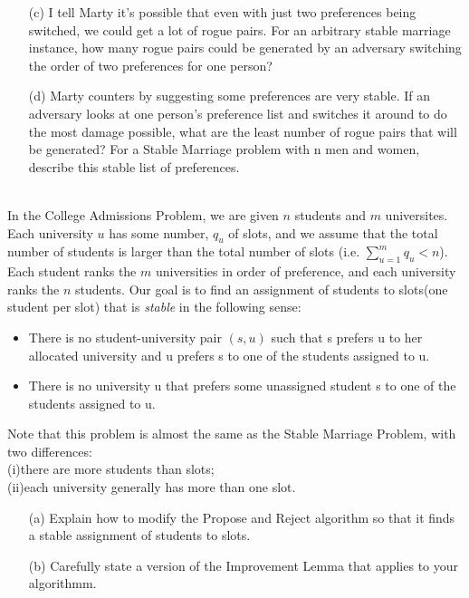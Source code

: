 \documentclass[11pt]{article}
\begin{document}
\begin{qunlist}
\begin{itemize}
\item[(c)] I tell Marty it's possible that even with just two preferences being switched, we could get a lot of rogue pairs. For an arbitrary stable marriage instance, how many rogue pairs could be generated by an adversary switching the order of two preferences for one person?
        
\item[(d)] Marty counters by suggesting some preferences are very stable. If an adversary looks at one person's preference list and switches it around to do the most damage possible, what are the least number of rogue pairs that will be generated? For a Stable Marriage problem with n men and women, describe this stable list of preferences.


\end{itemize}


\\
In the College Admissions Problem, we are given $n$ students and $m$ universites. Each university $u$ has some number, $q_u$ of slots, and we assume that the total number of students is larger than the total number of slots
(i.e. $\sum_{u=1}^m{q_u} < n$). Each student ranks the $m$ universities in order of preference, and each university ranks the $n$ students. Our goal is to find an assignment of students to slots(one student per slot) that is
\textit{stable} in the following sense:
\begin{itemize}
\item There is no student-university pair $(s,u)$ such that s prefers u to her allocated university and u prefers s to one of the students assigned to u.
\item There is no university u that prefers some unassigned student s to one of the students assigned to u.
\end{itemize}

Note that this problem is almost the same as the Stable Marriage Problem, with two differences: \\
(i)there are more students than slots; \\
(ii)each university generally has more than one slot.

\begin{itemize}
\item[(a)] Explain how to modify the Propose and Reject algorithm so that it finds a stable assignment of students to slots.

\item[(b)] Carefully state a version of the Improvement Lemma that applies to your algorithmm.


\end{itemize}
\end{qunlist}
\end{document}
